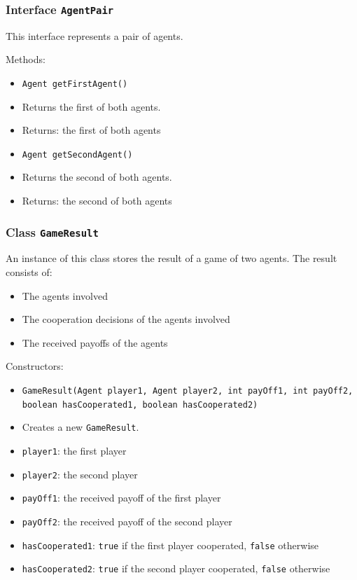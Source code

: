 \documentclass[parskip=full,11pt]{scrartcl}
\begin{document}
\subsubsection{Interface \texttt{AgentPair}}
This interface represents a pair of agents.

Methods:
\begin{itemize}\itemsep -10pt
\item \texttt{Agent getFirstAgent()}
\item[] Returns the first of both agents.
\item[] Returns: the first of both agents

\item \texttt{Agent getSecondAgent()}
\item[] Returns the second of both agents.
\item[] Returns: the second of both agents
\end{itemize}
\newpage
\subsubsection{Class \texttt{GameResult}}
An instance of this class stores the result of a game of two agents. The result consists of:

\begin{itemize}\itemsep -10pt
	\item The agents involved
	\item The cooperation decisions of the agents involved
	\item The received payoffs of the agents
\end{itemize}

Constructors:
\begin{itemize}\itemsep -10pt
\item \texttt{GameResult(Agent player1, Agent player2, int payOff1, int payOff2, boolean hasCooperated1, boolean hasCooperated2)}
\item[] Creates a new \texttt{GameResult}.
\item[] \texttt{player1}: the first player
\item[] \texttt{player2}: the second player
\item[] \texttt{payOff1}: the received payoff of the first player
\item[] \texttt{payOff2}: the received payoff of the second player
\item[] \texttt{hasCooperated1}: \texttt{true} if the first player cooperated, \texttt{false} otherwise
\item[] \texttt{hasCooperated2}: \texttt{true} if the second player cooperated, \texttt{false} otherwise
\end{itemize}
\end{document}

